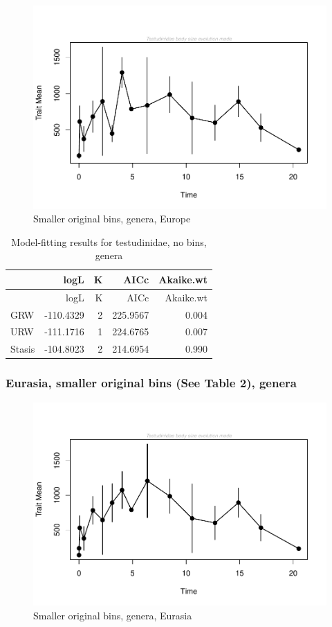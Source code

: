 \documentclass[]{article}
\begin{document}
\begin{figure}[htbp]
\centering
\includegraphics{MA_JJ_files/figure-latex/paleoTS with different time bins, no bins, genera, Europe-1.pdf}
\caption{Smaller original bins, genera, Europe}
\end{figure}

\begin{longtable}[]{@{}lrrrr@{}}
\caption{Model-fitting results for testudinidae, no bins,
genera}\tabularnewline
\toprule
& logL & K & AICc & Akaike.wt\tabularnewline
\midrule
\endfirsthead
\toprule
& logL & K & AICc & Akaike.wt\tabularnewline
\midrule
\endhead
GRW & -110.4329 & 2 & 225.9567 & 0.004\tabularnewline
URW & -111.1716 & 1 & 224.6765 & 0.007\tabularnewline
Stasis & -104.8023 & 2 & 214.6954 & 0.990\tabularnewline
\bottomrule
\end{longtable}

\newpage 

\subsubsection{Eurasia, smaller original bins (See Table 2),
genera}\label{eurasia-smaller-original-bins-see-table-2-genera}

\begin{figure}[htbp]
\centering
\includegraphics{MA_JJ_files/figure-latex/paleoTS with different time bins, no bins, genera, Eurasia-1.pdf}
\caption{Smaller original bins, genera, Eurasia}
\end{figure}
\end{document}
